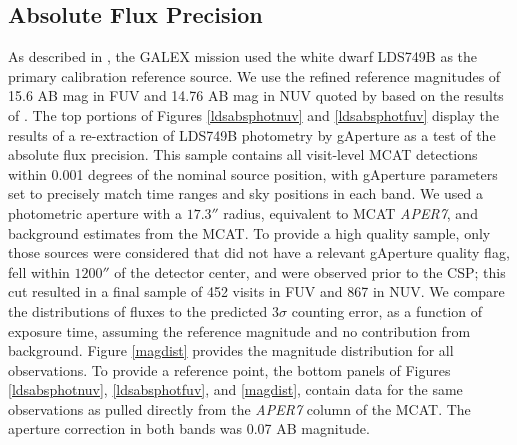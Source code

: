\documentclass[preprint]{aastex}
\begin{document}
\subsection{Absolute Flux Precision}
As described in \citet{mor2007}, the GALEX mission used the white dwarf LDS749B as the primary calibration reference source. We use the refined reference magnitudes of 15.6 AB mag in FUV and 14.76 AB mag in NUV quoted by \cite{camarota2014white} based on the results of \cite{bohlin2008absolute}. The top portions of Figures \ref{ldsabsphotnuv} and \ref{ldsabsphotfuv} display the results of a re-extraction of LDS749B photometry by gAperture as a test of the absolute flux precision. This sample contains all visit-level MCAT detections within 0.001 degrees of the nominal source position, with gAperture parameters set to precisely match time ranges and sky positions in each band. We used a photometric aperture with a $17.3''$ radius, equivalent to MCAT \emph{APER7}, and background estimates from the MCAT. To provide a high quality sample, only those sources were considered that did not have a relevant gAperture quality flag, fell within $1200''$ of the detector center, and were observed prior to the CSP; this cut resulted in a final sample of 452 visits in FUV and 867 in NUV. We compare the distributions of fluxes to the predicted 3$\sigma$ counting error, as a function of exposure time, assuming the reference magnitude and no contribution from background. Figure \ref{magdist} provides the magnitude distribution for all observations. To provide a reference point, the bottom panels of Figures \ref{ldsabsphotnuv}, \ref{ldsabsphotfuv}, and \ref{magdist}, contain data for the same observations as pulled directly from the \emph{APER7} column of the MCAT. The aperture correction in both bands was 0.07 AB magnitude.
\end{document}
